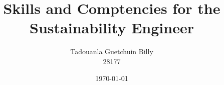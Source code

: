 \usepackage[margin=1in, top=1.2in, bottom=1.2in]{geometry}

\usepackage[T1]{fontenc}
\usepackage{lmodern}
\usepackage{microtype}

\usepackage[english]{babel}
\usepackage{amsmath, amssymb, amsthm}
\usepackage{csquotes}

\usepackage{booktabs}
\usepackage{graphicx}
\usepackage{xcolor}


\usepackage[backend=biber, style=numeric-comp, sorting=nyt, giveninits=true]{biblatex}


\usepackage[
  pdfencoding=auto,
  colorlinks=true,
  linkcolor=navyblue,
  citecolor=navyblue,
  urlcolor=navyblue
]{hyperref}

\title{Skills and Comptencies for the Sustainability Engineer}
\author{Tadouanla Guetchuin Billy \\ 28177}

\date{\today}
